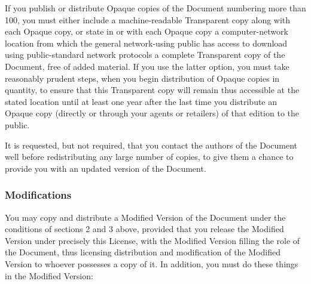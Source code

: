 If you publish or distribute Opaque copies of the Document numbering
more than 100, you must either include a machine-readable Transparent
copy along with each Opaque copy, or state in or with each Opaque copy
a computer-network location from which the general network-using
public has access to download using public-standard network protocols
a complete Transparent copy of the Document, free of added material.
If you use the latter option, you must take reasonably prudent steps,
when you begin distribution of Opaque copies in quantity, to ensure
that this Transparent copy will remain thus accessible at the stated
location until at least one year after the last time you distribute an
Opaque copy (directly or through your agents or retailers) of that
edition to the public.

It is requested, but not required, that you contact the authors of the
Document well before redistributing any large number of copies, to give
them a chance to provide you with an updated version of the Document.

\subsubsection{Modifications}

You may copy and distribute a Modified Version of the Document under
the conditions of sections 2 and 3 above, provided that you release
the Modified Version under precisely this License, with the Modified
Version filling the role of the Document, thus licensing distribution
and modification of the Modified Version to whoever possesses a copy
of it.  In addition, you must do these things in the Modified Version:

